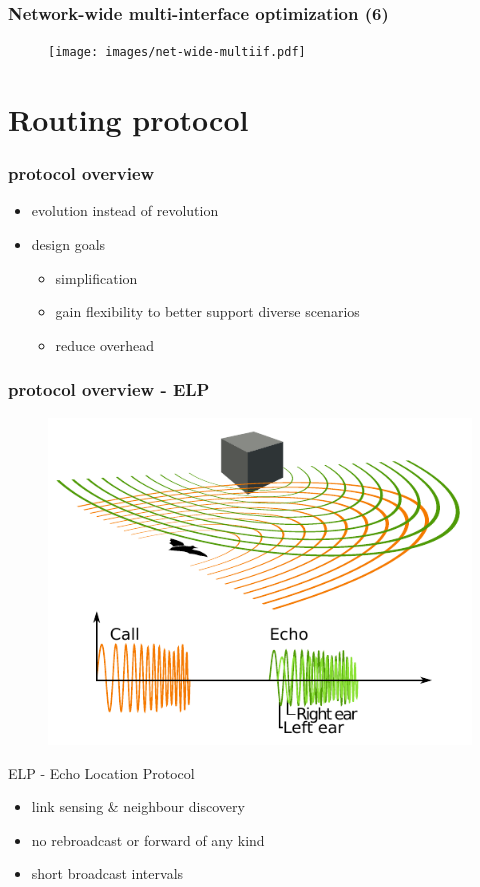 \documentclass[slidestop]{beamer}
\begin{document}
\begin{frame}[c]
	\frametitle{Network-wide multi-interface optimization (6)}

	\begin{figure}
		\centering
		\texttt{[image: images/net-wide-multiif.pdf]}
	\end{figure}
\end{frame}

\section{Routing protocol}
\begin{frame}[c]
	\frametitle{protocol overview}
	\begin{itemize}
		\item evolution instead of revolution
		\item design goals
			\begin{itemize}
				\item simplification
				\item gain flexibility to better support diverse scenarios
				\item reduce overhead
			\end{itemize}
	\end{itemize}
\end{frame}

\begin{frame}[c]
	\frametitle{protocol overview - ELP}
	\begin{figure}
		\centering
		\includegraphics[scale=0.5]{ext_images/Animal_echolocation.pdf}
	\end{figure}

	ELP - Echo Location Protocol
	\begin{itemize}
		\item link sensing \& neighbour discovery
		\item no rebroadcast or forward of any kind
		\item short broadcast intervals
	\end{itemize}
\end{frame}
\end{document}
